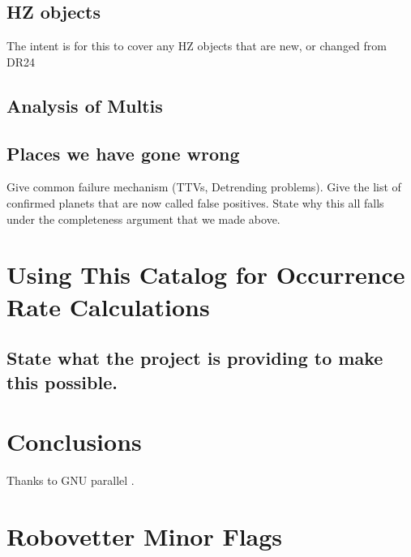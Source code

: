\documentclass[apj,twocolappendix,numberedappendix]{emulateapj}
\renewcommand{\_}{\discretionary{\underscore}{}{\underscore}}  %
\begin{document}
\subsection{HZ objects}
The intent is for this to cover any HZ objects that are new, or changed from DR24

\subsection{Analysis of Multis}

\subsection{Places we have gone wrong}
Give common failure mechanism (TTVs, Detrending problems).  Give the list of confirmed planets that are now called false positives.  State why this all falls under the completeness argument that we made above.

\section{Using This Catalog for Occurrence Rate Calculations}
\subsection{State what the project is providing to make this possible.}


\section{Conclusions}

\acknowledgments
Thanks to GNU parallel \citep{Tange2011a}.


\section{Robovetter Minor Flags}
%


\end{document}
